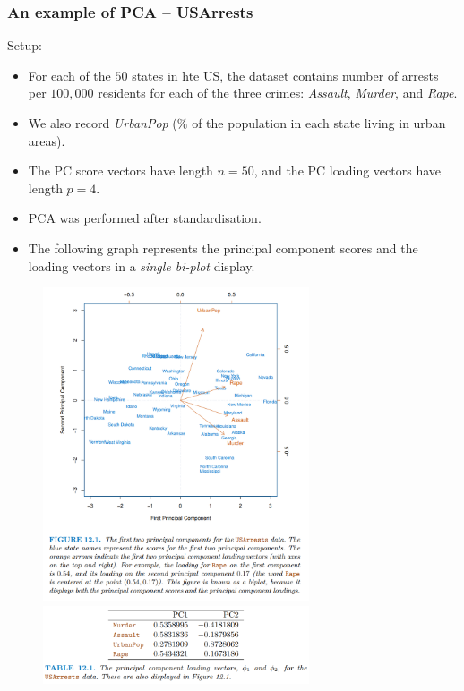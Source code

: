 \documentclass[11pt]{article}
\begin{document}
\subsubsection{An example of PCA -- USArrests}
\noindent Setup:
\begin{itemize}
    \item For each of the $50$ states in hte US, the dataset contains number of arrests per $100,000$ residents for each of the three crimes: \textit{Assault}, \textit{Murder}, and \textit{Rape}.
    \item We also record \textit{UrbanPop} ($\%$ of the population in each state living in urban areas).
    \item The PC score vectors have length $n=50$, and the PC loading vectors have length $p=4$.
    \item PCA was performed after standardisation.
    \item The following graph represents the principal component scores and the loading vectors in a \textit{single bi-plot} display. 
\end{itemize}

\begin{figure}[h]
    \centering
    \includegraphics[width=0.7\textwidth]{Unsupervised - USArrests - Biplot.png}
    \includegraphics[width=0.7\textwidth]{Unsupervised - USArrests - Biplot Table Data.png}
\end{figure}
\end{document}
